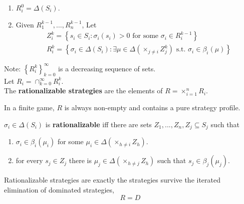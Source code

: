 \documentclass[11pt]{elegantbook_2}
\begin{document}
\begin{definition}
    \begin{enumerate}[$\bullet$]
        \item $R_i^0=\Delta\left(S_i\right)$.
        \item Given $R_1^{k-1}, \ldots, R_n^{k-1}$, Let
        $$
        \begin{aligned}
        & Z_i^k=\left\{s_i \in S_i: \sigma_i\left(s_i\right)>0 \text { for some } \sigma_i \in R_i^{k-1}\right\} \\
        & R_i^k=\left\{\sigma_i \in \Delta\left(S_i\right): \exists \mu \in \Delta\left(\times_{j \neq i} Z_j^k\right) \text { s.t. } \sigma_i \in \beta_i(\mu)\right\}
        \end{aligned}
        $$
    \end{enumerate}
    Note: $\left\{R_i^k\right\}_{k=0}^{\infty}$ is a decreasing sequence of sets.\\
    Let $R_i=\cap_{k=0}^{\infty} R_i^k$.\\
    The \textbf{rationalizable strategies} are the elements of $R=\times_{i=1}^n R_i$.
\end{definition}

\begin{lemma}
    In a finite game, $R$ is always non-empty and contains a pure strategy profile.
\end{lemma}

\begin{proposition}
    $\sigma_i \in \Delta(S_i)$ is \textbf{rationalizable} iff there are sets $Z_1,..., Z_n, Z_j \subseteq S_j$ such that
    \begin{enumerate}
        \item $\sigma_i \in \beta_i(\mu_i)$ for some $\mu_i \in \Delta(\times_{h\neq i}Z_h)$.
        \item for every $s_j \in Z_j$ there is $\mu_j \in \Delta(\times_{h\neq j}Z_h)$ such that $s_j\in \beta_j(\mu_j)$.
    \end{enumerate}
\end{proposition}

\begin{corollary}[Rationalizable = IEDS]
    Rationalizable strategies are exactly the strategies survive the iterated elimination of dominated strategies, $$R=D$$
\end{corollary}
\end{document}
